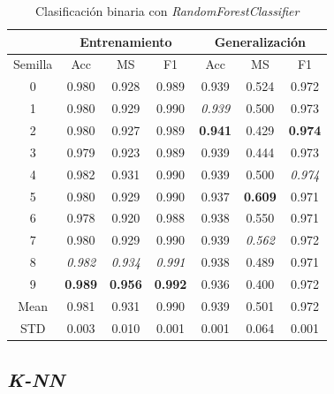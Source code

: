 \begin{table}[H]
	\centering
	\begin{tabular}{ |c|c|c|c|c|c|c| }
		\hline
		\rowcolor{LightCyan}
		 & \multicolumn{3}{c|}{Entrenamiento} & \multicolumn{3}{c|}{Generalización} \\
		\hline
		\rowcolor{LightCyan}
		 Semilla & Acc & MS & F1 & Acc & MS & F1 \\
		\hline
		0    & 0.980          & 0.928          & 0.989          & 0.939          & 0.524          & 0.972          \\
		1    & 0.980          & 0.929          & 0.990          & \textit{0.939} & 0.500          & 0.973          \\
		2    & 0.980          & 0.927          & 0.989          & \textbf{0.941} & 0.429          & \textbf{0.974} \\
		3    & 0.979          & 0.923          & 0.989          & 0.939          & 0.444          & 0.973          \\
		4    & 0.982          & 0.931          & 0.990          & 0.939          & 0.500          & \textit{0.974} \\
		5    & 0.980          & 0.929          & 0.990          & 0.937          & \textbf{0.609} & 0.971          \\
		6    & 0.978          & 0.920          & 0.988          & 0.938          & 0.550          & 0.971          \\
		7    & 0.980          & 0.929          & 0.990          & 0.939          & \textit{0.562} & 0.972          \\
		8    & \textit{0.982} & \textit{0.934} & \textit{0.991} & 0.938          & 0.489          & 0.971          \\
		9    & \textbf{0.989} & \textbf{0.956} & \textbf{0.992} & 0.936          & 0.400          & 0.972          \\
		Mean & 0.981          & 0.931          & 0.990          & 0.939          & 0.501          & 0.972          \\
		STD  & 0.003          & 0.010          & 0.001          & 0.001          & 0.064          & 0.001          \\
		\hline
	\end{tabular}
	\caption{Clasificación binaria con \textit{RandomForestClassifier}}
	\label{tabla:rf_bin}
\end{table}

\newpage
\subsection{\textit{K-NN}}
\label{subsec:knn_bin}

